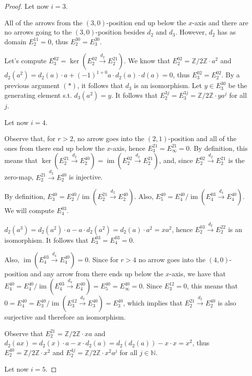 \documentclass{article}
\newcommand{\numberset}{\mathbb}
\newcommand{\N}{\numberset{N}}
\newcommand{\Z}{\numberset{Z}}
\DeclareMathOperator{\im}{im}
\begin{document}
\begin{proof}
    Let now $i=3$.

    All of the arrows from the $(3,0)$-position end up below the $x$-axis and
    there are no arrows going to the $(3,0)$-position besides $d_2$ and $d_3$.
    However, $d_2$ has as domain $E^{11}_2=0$, thus $E^{30}_2=E^{30}_3$.

    Let's compute $E^{02}_3=\ker(E^{02}_2\xrightarrow{d_2}E^{21}_2)$. We know
    that $E^{02}_2=\Z/2\Z\cdot a^2$ and $d_2(a^2)=d_2(a)\cdot a+(-1)^{1+0}a\cdot
    d_2(a)\cdot d(a)=0$, thus $E^{02}_3=E^{02}_2$. By a previous argument $(*)$,
    it follows that $d_3$ is an isomorphism. Let $y\in E^{30}_3$ be the
    generating element s.t. $d_3(a^2)=y$. It follows that
    $E^{3j}_2=E^{3j}_3=\Z/2\Z\cdot ya^j$ for all $j$.

    Let now $i=4$.

    Observe that, for $r>2$, no arrow goes into the $(2,1)$-position and all of
    the ones from there end up below the $x$-axis, hence
    $E^{21}_3=E^{21}_\infty=0$. By definition, this means that
    $\ker(E^{21}_2\xrightarrow{d_2}E^{40}_2)=\im(E^{02}_2\xrightarrow{d_2}E^{21}_2)$,
    and, since $E^{02}_2\xrightarrow{d_2}E^{21}_2$ is the zero-map,
    $E^{21}_2\xrightarrow{d_2}E^{40}_2$ is injective.

    By definition, $E^{40}_3=E^{40}_2/\im(E^{21}_2\xrightarrow{d_2}E^{40}_2)$.
    Also, $E^{40}_5=E^{40}_4/\im(E^{03}_4\xrightarrow{d_4}E^{40}_4)$. We will
    compute $E^{03}_4$.

    $d_2(a^3)=d_2(a^2)\cdot a-a\cdot d_2(a^2)=d_2(a)\cdot a^2=xa^2$, hence
    $E^{03}_2\xrightarrow{d_2}E^{22}_2$ is an isomorphism. It follows that
    $E^{03}_3=E^{03}_4=0$.
    
    Also, $\im(E^{03}_4\xrightarrow{d_4}E^{40}_4)=0$. Since for $r>4$ no
    arrow goes into the $(4,0)$-position and any arrow from there ends up below
    the $x$-axis, we have that
    $E^{40}_4=E^{40}_4/\im(E^{03}_4\xrightarrow{d_4}E^{40}_4)=
    E^{40}_5=E^{40}_\infty=0$. Since $E^{12}_3=0$, this means that
    $0=E^{40}_4=E^{40}_3/\im(E^{12}_3\xrightarrow{d_3}E^{40}_3)=E^{40}_3$, which
    implies that $E^{21}_2\xrightarrow{d_2}E^{40}_2$ is also surjective and
    therefore an isomorphism.

    Observe that $E^{21}_2=\Z/2\Z\cdot xa$ and $d_2(ax)=d_2(x)\cdot a-x\cdot
    d_2(a)=d_2(d_2(a))-x\cdot x=x^2$, thus $E^{40}_2=\Z/2\Z\cdot x^2$ and
    $E^{4j}_2=\Z/2\Z\cdot x^2a^j$ for all $j\in\N$.

    Let now $i=5$.


\end{proof}

\printbibliography
\end{document}

